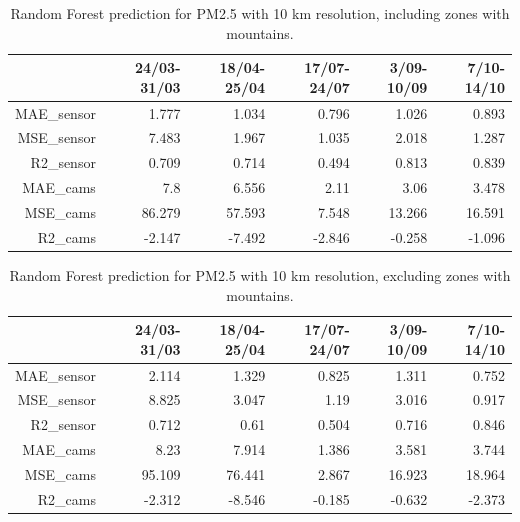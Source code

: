 \begin{table}[H]
\begin{tabular}{rrrrrr}
\hline
       &   24/03-31/03 &   18/04-25/04 &   17/07-24/07 &   3/09-10/09 &   7/10-14/10 \\
\hline
   MAE\_sensor   &1.777 &1.034 &0.796 &1.026 &0.893 \\
   MSE\_sensor   &7.483 &            1.967 &            1.035 &            2.018 &            1.287 \\
   R2\_sensor    & 0.709 &            0.714 &            0.494 &            0.813 &            0.839 \\
   MAE\_cams     &7.8   &            6.556 &            2.11  &            3.06  &3.478 \\
   MSE\_cams     &86.279 &           57.593 &            7.548 &           13.266 &16.591 \\
   R2\_cams&-2.147 &           -7.492 &           -2.846 &           -0.258 &           -1.096 \\
\hline
\end{tabular}
\caption{Random Forest prediction for PM2.5 with 10 km resolution, including zones with mountains.}
\end{table}
\bigskip
\begin{table}[H]
\begin{tabular}{rrrrrr}
\hline
      &   24/03-31/03 &   18/04-25/04 &   17/07-24/07 &   3/09-10/09 &   7/10-14/10 \\
\hline
  MAE\_sensor   &            2.114 &            1.329 &            0.825 &            1.311 &            0.752 \\
  MSE\_sensor   &            8.825 &            3.047 &            1.19  &            3.016 &            0.917 \\
  R2\_sensor    &            0.712 &            0.61  &            0.504 &            0.716 &            0.846 \\
  MAE\_cams     &            8.23  &            7.914 &            1.386 &            3.581 &            3.744 \\
   MSE\_cams     &           95.109 &           76.441 &            2.867 &           16.923 &           18.964 \\
   R2\_cams      &           -2.312 &           -8.546 &           -0.185 &           -0.632 &           -2.373 \\
\hline
\end{tabular}
\caption{Random Forest prediction for PM2.5 with 10 km resolution, excluding zones with mountains.}
\end{table}


